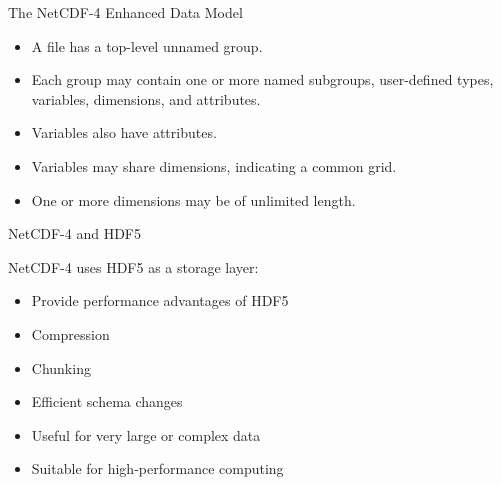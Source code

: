 \documentclass[compress,11pt,xcolor=svgnames,aspectratio=169]{beamer}
\begin{document}
\begin{frame}[t]{The NetCDF-4 Enhanced Data Model}

    \begin{itemize}
    \setlength\itemsep{0.3cm}
        \item A file has a top-level unnamed group.
        \item Each group may contain one or more named subgroups, user-defined types, variables, dimensions, and attributes.
        \item Variables also have attributes.
        \item Variables may share dimensions, indicating a common grid.
        \item One or more dimensions may be of unlimited length.
    \end{itemize}

\nocite{netcdf}

\end{frame}

\begin{frame}[t]{NetCDF-4 and HDF5}

NetCDF-4 uses HDF5 as a storage layer:

\begin{itemize}
\setlength\itemsep{0.4cm}

    \item Provide performance advantages of HDF5
    \item Compression
    \item Chunking
    \item Efficient schema changes
    \item Useful for very large or complex data
    \item Suitable for high-performance computing

\nocite{netcdf}

\end{itemize}

\end{frame}
\end{document}
